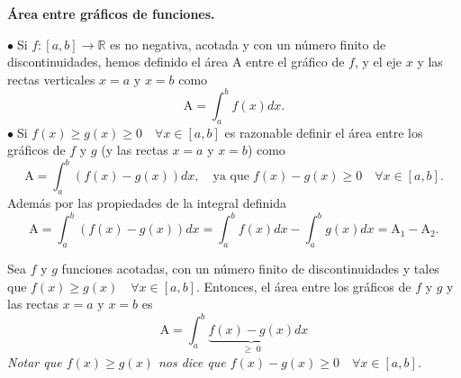 \documentclass{article}
\theoremstyle{definition}
\theoremstyle{definition}
\theoremstyle{remark}
\newcommand\R{\ensuremath{\mathbb{R}}}
\newcommand\bl{$\bullet\;$}
\begin{document}
\begin{center}
\textbf{Área entre gráficos de funciones.}
\end{center}
\bl Si $f : [a,b] \to \R $ es no negativa, acotada y con un número finito de discontinuidades, hemos definido el área A entre el gráfico de $f$, y el eje $x$ y las rectas verticales $x=a$ y $x=b$ como \[
\text{A} = \int_{a}^{b}{f(x)dx}.
\]
\bl Si $f(x) \geq g(x) \geq 0 \quad \forall x \in [a,b] $ es razonable definir el área entre los gráficos de $f$ y $g$ (y las rectas $x=a$ y $x=b$) como \[
\text{A} = \int_{a}^{b}{(f(x)-g(x))dx}, \quad \text{ya que}\; f(x)-g(x) \geq 0 \quad \forall x \in [a,b].
\]
Además por las propiedades de la integral definida \[
\text{A} = \int_{a}^{b}{(f(x)-g(x))dx}=\int_{a}^{b}{f(x)dx}-\int_{a}^{b}{g(x)dx}=\text{A}_1-\text{A}_2.
\]

\begin{figure}[h]
\centering
\def\svgwidth{0.75\textwidth}

\end{figure}
\begin{teo}
  Sea $f$ y $g$ funciones acotadas, con un número finito de discontinuidades y tales que $f(x) \geq g(x) \quad \forall x \in [a,b]$. Entonces, el área entre los gráficos de $f$ y $g$ y las rectas $x=a$ y $x=b$ es \[
\text{A} = \int_{a}^{b}{\underbrace{f(x)-g(x)}_{\geq \; 0}dx}
  \]
\emph{Notar que $f(x) \geq g(x)$ nos dice que $f(x)-g(x)\geq 0 \quad \forall x \in [a,b]$. }
\end{teo}
\end{document}
